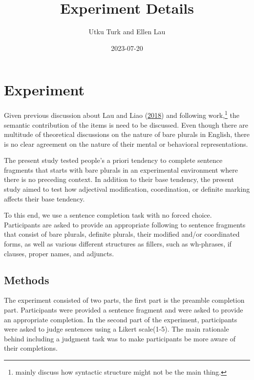 \documentclass[
  10pt,
  letterpaper,
  DIV=11,
  numbers=noendperiod]{scrartcl}
\title{Experiment Details}
\author{Utku Turk and Ellen Lau}
\date{2023-07-20}
\renewcommand\maketitle{
  \fancyhead[C]{
    \mythetitle
    \ifx \theauthor\empty  \else \ – \theauthor \fi
    \ifx \thedate\empty  \else \ – \thedate \ \fi
    – Word Count: 1169
  }
}
\begin{document}
\maketitle
\ifdefined\Shaded\renewenvironment{Shaded}{\begin{tcolorbox}[frame hidden, breakable, enhanced, boxrule=0pt, sharp corners, interior hidden, borderline west={3pt}{0pt}{shadecolor}]}{\end{tcolorbox}}\fi

\hypertarget{experiment}{%
\section{Experiment}\label{experiment}}

Given previous discussion about Lau and Liao
(\protect\hyperlink{ref-LauLiao2018}{2018}) and following
work,\footnote{mainly discuss how syntactic structure might not be the main thing.}
the semantic contribution of the items is need to be discussed. Even
though there are multitude of theoretical discussions on the nature of
bare plurals in English, there is no clear agreement on the nature of
their mental or behavioral representations.

The present study tested people's a priori tendency to complete sentence
fragments that starts with bare plurals in an experimental environment
where there is no preceding context. In addition to their base tendency,
the present study aimed to test how adjectival modification,
coordination, or definite marking affects their base tendency.

To this end, we use a sentence completion task with no forced choice.
Participants are asked to provide an appropriate following to sentence
fragments that consist of bare plurals, definite plurals, their modified
and/or coordinated forms, as well as various different structures as
fillers, such as wh-phrases, if clauses, proper names, and adjuncts.

\hypertarget{methods}{%
\subsection{Methods}\label{methods}}

The experiment consisted of two parts, the first part is the preamble
completion part. Participants were provided a sentence fragment and were
asked to provide an appropriate completion. In the second part of the
experiment, participants were asked to judge sentences using a Likert
scale(1-5). The main rationale behind including a judgment task was to
make participants be more aware of their completions.
\end{document}
